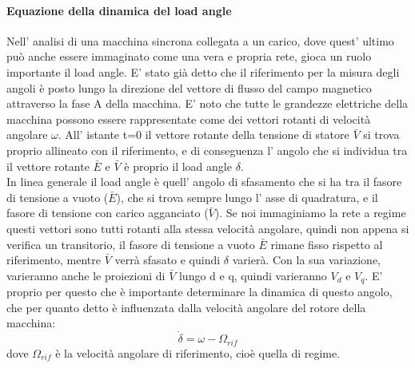 \documentclass[Lau,noexaminfo]{sapthesis}
\begin{document}
	\paragraph{Equazione della dinamica del load angle}
	Nell' analisi di una macchina sincrona collegata a un carico, dove quest' ultimo può anche essere immaginato come una vera e propria rete, gioca un ruolo importante il load angle. E' stato già detto che il riferimento per la misura degli angoli è posto lungo la direzione del vettore di flusso del campo magnetico attraverso la fase A della macchina. E' noto che tutte le grandezze elettriche della macchina possono essere rappresentate come dei vettori rotanti di velocità angolare $\omega$. All' istante t=0 il vettore rotante della tensione di statore $\bar{V}$ si trova proprio allineato con il riferimento, e di conseguenza l' angolo che si individua tra il vettore rotante $\bar{E}$ e $\bar{V}$ è proprio il load angle $\delta$.\\
	In linea generale il load angle è quell' angolo di sfasamento che si ha tra il fasore di tensione a vuoto ($\bar{E}$), che si trova sempre lungo l' asse di quadratura, e il fasore di tensione con carico agganciato ($\bar{V}$). Se noi immaginiamo la rete a regime questi vettori sono tutti rotanti alla stessa velocità angolare, quindi non appena si verifica un transitorio, il fasore di tensione a vuoto $\bar{E}$ rimane fisso rispetto al riferimento, mentre $\bar{V}$ verrà sfasato e quindi $\delta$ varierà. Con la sua variazione, varieranno anche le proiezioni di $\bar{V}$ lungo d e q, quindi varieranno $V_d$ e $V_q$. E' proprio per questo che è importante determinare la dinamica di questo angolo, che per quanto detto è influenzata dalla velocità angolare del rotore della macchina:\\
	\begin{equation}
	\dot{\delta}=\omega-\Omega_{rif}
	\end{equation}
	dove $\Omega_{rif}$ è la velocità angolare di riferimento, cioè quella di regime.
	
\end{document}
